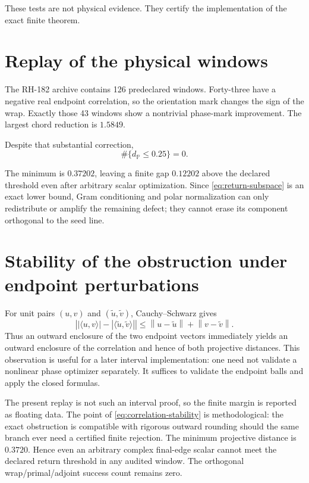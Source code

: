 \documentclass[12pt]{article}
\theoremstyle{remark}
\newcommand{\norm}[1]{\left\lVert#1\right\rVert}
\begin{document}
These tests are not physical evidence.  They certify the implementation of
the exact finite theorem.

\section{Replay of the physical windows}

The RH-182 archive contains 126 predeclared windows.  Forty-three have a
negative real endpoint correlation, so the orientation mark changes the
sign of the wrap.  Exactly those 43 windows show a nontrivial phase-mark
improvement.  The largest chord reduction is $1.5849$.

Despite that substantial correction,
\begin{equation}\label{eq:no-projective-return}
 \#\{d_{\mathbb P}\le0.25\}=0.
\end{equation}

The minimum is $0.37202$, leaving a finite gap $0.12202$ above the declared
threshold even after arbitrary scalar optimization.  Since
\eqref{eq:return-subspace} is an exact lower bound, Gram conditioning and
polar normalization can only redistribute or amplify the remaining defect;
they cannot erase its component orthogonal to the seed line.

\section{Stability of the obstruction under endpoint perturbations}

For unit pairs $(u,v)$ and $(\widetilde u,\widetilde v)$, Cauchy--Schwarz
gives
\begin{equation}\label{eq:correlation-stability}
 \left|
 |\langle u,v\rangle|-|\langle\widetilde u,\widetilde v\rangle|
 \right|
 \le \norm{u-\widetilde u}+\norm{v-\widetilde v}.
\end{equation}
Thus an outward enclosure of the two endpoint vectors immediately yields an
outward enclosure of the correlation and hence of both projective
distances.  This observation is useful for a later interval implementation:
one need not validate a nonlinear phase optimizer separately.  It suffices
to validate the endpoint balls and apply the closed formulas.

The present replay is not such an interval proof, so the finite margin is
reported as floating data.  The point of \eqref{eq:correlation-stability} is
methodological: the exact obstruction is compatible with rigorous outward
rounding should the same branch ever need a certified finite rejection.
The minimum projective distance is $0.3720$.  Hence even an arbitrary complex
final-edge scalar cannot meet the declared return threshold in any audited
window.  The orthogonal wrap/primal/adjoint success count remains zero.
\end{document}
